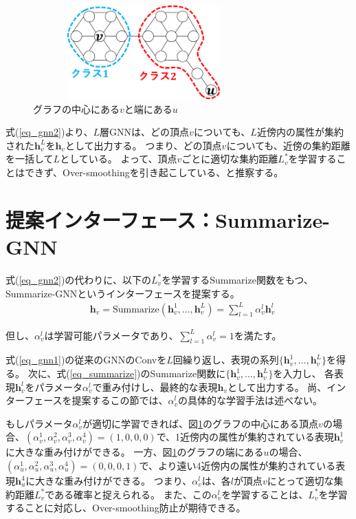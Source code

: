 \documentclass[a4j,twocolumn]{jsarticle}
\begin{document}
\begin{figure}[!h]
  \centering
  \includegraphics[height=3.6cm,width=8.5cm]{example1.pdf}
  \vspace{-6mm}
  \caption{グラフの中心にある$v$と端にある$u$}
  \label{fig_example1}
\end{figure}

\vspace{-1mm}
式(\ref{eq_gnn2})より、$L$層GNNは、どの頂点$v$についても、$L$近傍内の属性が集約された$\bm{h}_v^L$を$\bm{h}_v$として出力する。
つまり、どの頂点$v$についても、近傍の集約距離を一括して$L$としている。
よって、頂点$v$ごとに適切な集約距離$L_v^*$を学習することはできず、Over-smoothingを引き起こしている、と推察する。

\section{提案インターフェース：Summarize-GNN}
\label{sec_proposal}

式(\ref{eq_gnn2})の代わりに、以下の$L_v^*$を学習するSummarize関数をもつ、Summarize-GNNというインターフェースを提案する。\vspace{-3mm}
\begin{align}
  & \bm{h}_v   = \text{Summarize}(\bm{h}_v^1,\ldots,\bm{h}_v^L) = \sum_{l=1}^L \alpha_v^l \bm{h}_v^l \label{eq_summarize}
\end{align}

\vspace{-2mm}
\noindent
但し、$\alpha_v^l$は学習可能パラメータであり、$\sum_{l=1}^L \alpha_v^l=1$を満たす。

式(\ref{eq_gnn1})の従来のGNNのConvを$L$回繰り返し、表現の系列$\{\bm{h}_v^1,\ldots,\bm{h}_v^L\}$を得る。
次に、式(\ref{eq_summarize})のSummarize関数に$\{\bm{h}_v^1,\ldots,\bm{h}_v^L\}$を入力し、
各表現$\bm{h}_v^l$をパラメータ$\alpha_v^l$で重み付けし、最終的な表現$\bm{h}_v$として出力する。
尚、インターフェースを提案するこの節では、$\alpha_v^l$の具体的な学習手法は述べない。

もしパラメータ$\alpha_v^l$が適切に学習できれば、図\ref{fig_example1}のグラフの中心にある頂点$v$の場合、$(\alpha_v^1,\alpha_v^2,\alpha_v^3,\alpha_v^4)=(1,0,0,0)$で、1近傍内の属性が集約されている表現$\bm{h}_v^1$に大きな重み付けができる。
一方、図\ref{fig_example1}のグラフの端にある$u$の場合、$(\alpha_u^1,\alpha_u^2,\alpha_u^3,\alpha_u^4)=(0,0,0,1)$で、より遠い4近傍内の属性が集約されている表現$\bm{h}_u^4$に大きな重み付けができる。
つまり、$\alpha_v^l$は、各$l$が頂点$v$にとって適切な集約距離$L_v^*$である確率と捉えられる。
また、この$\alpha_v^l$を学習することは、$L_v^*$を学習することに対応し、Over-smoothing防止が期待できる。
\end{document}

